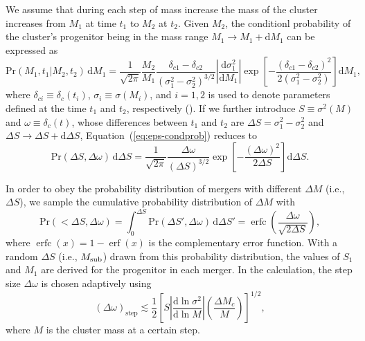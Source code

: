 \documentclass[modern]{aastex61}
\newcommand{\R}[1]{\mathrm{#1}}
\newcommand{\D}[1]{\R{d} #1}
\newcommand{\diff}[2]{\frac{\D{#1}}{\D{#2}}}
\DeclareMathOperator{\erf}{erf}
\DeclareMathOperator{\erfc}{erfc}
\begin{document}
We assume that during each step of mass increase the mass of the cluster
increases from $M_{1}$ at time $t_{1}$ to $M_{2}$ at $t_{2}$.
Given $M_{2}$, the conditionl probability of the cluster's progenitor being
in the mass range $M_{1} \to M_{1} + \D{M_{1}}$
can be expressed as
\begin{equation}
  \R{Pr}(M_1, t_1 | M_2, t_2) \,\D{M_1} = \frac{1}{\sqrt{2\pi}}
\frac{M_2}{M_1}
  \frac{\delta_{c1} - \delta_{c2}}{(\sigma_1^2 - \sigma_2^2)^{3/2}}
  \left| \diff{\sigma_1^2}{M_1} \right|
  \exp \!\left[ -\frac{(\delta_{c1} - \delta_{c2})^2}
    {2(\sigma_1^2 - \sigma_2^2)} \right] \D{M_1},
\end{equation}
where
$\delta_{ci} \equiv \delta_c(t_i)$, $\sigma_i \equiv \sigma(M_i)$, and $i =
1, 2$ is used to denote parameters defined at the time $t_{1}$ and $t_{2}$,
respectively (\citep{lacey1993,randall2002}).
If we further introduce $S \equiv \sigma^2(M)$ and $\omega \equiv
\delta_c(t)$, whose differences between $t_{1}$ and $t_{2}$
are $\Delta S = \sigma_1^2 - \sigma_2^2$ and $\Delta S \to \Delta S +
\D{\Delta S}$, Equation~(\ref{eq:eps-condprob}) reduces to
\begin{equation}
  \R{Pr}(\Delta S, \Delta \omega) \,\D{\Delta S} = \frac{1}{\sqrt{2\pi}}
  \frac{\Delta\omega}{(\Delta S)^{3/2}}
  \exp \!\left[ -\frac{(\Delta\omega)^2}{2 \Delta S} \right] \D{\Delta S}.
\end{equation}

In order to obey the probability distribution of mergers with different
$\Delta M$ (i.e., $\Delta S$),
we sample the cumulative probability distribution of $\Delta M$ with
\begin{equation}
  \R{Pr}(<\!\Delta S, \Delta\omega) =
  \int_0^{\Delta S} \R{Pr}(\Delta S', \Delta\omega) \,\D{\Delta S'} =
  \erfc \!\left( \frac{\Delta \omega}{\sqrt{2 \Delta S}} \right),
\end{equation}
where $\erfc(x) = 1 - \erf(x)$ is the complementary error function.
With a random $\Delta S$ (i.e., $M_{\rm sub}$) drawn from this probability
distribution, the values of $S_1$ and $M_{1}$
are derived for the progenitor in each merger.
In the calculation, the step size $\Delta\omega$ is chosen adaptively
\citep{randall2002} using
\begin{equation}
  (\Delta\omega)_{\R{step}} \lesssim \frac{1}{2} \left[
    S \left| \diff{\ln \sigma^2}{\ln M} \right|
    \left( \frac{\Delta M_c}{M} \right) \right]^{1/2},
\end{equation}
where $M$ is the cluster mass at a certain step.
\end{document}
